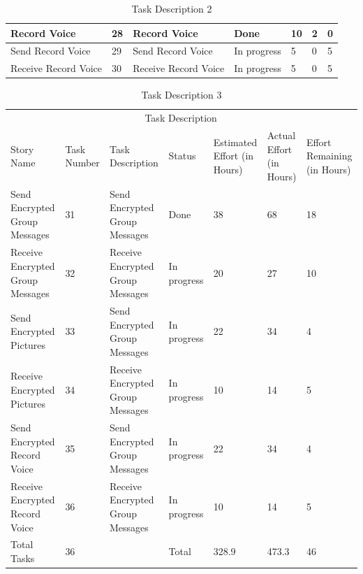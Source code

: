 \documentclass[a4paper]{article}
\begin{document}
\begin{table}[H]
\begin{tabular}{p{3cm} p{1cm} p{3.5cm} p{1cm} p{1cm} p{1cm} p{1cm}}
 Record Voice & 28 & Record Voice & Done & 10 & 2 & 0\\ 
 \midrule
 
 Send Record Voice & 29 & Send Record Voice & In progress & 5 & 0 & 5\\ 
 \midrule
 
 Receive Record Voice & 30 & Receive Record Voice & In progress & 5 & 0 & 5\\ 
\hline
\end{tabular}
\caption{Task Description 2} %
\label{tab:template} %
\end{table}

\vfill
\clearpage


\begin{table}[H]
\begin{tabular}{p{3cm} p{1cm} p{3.5cm} p{1cm} p{1cm} p{1cm} p{1cm}} 
\hline %
& \multicolumn{5}{c}{Task Description} \\
\cmidrule(l){2-7}
Story Name & Task Number & Task Description & Status & Estimated Effort (in Hours) & Actual Effort (in Hours) & Effort Remaining (in Hours)\\ %
\hline

  Send Encrypted Group Messages & 31 & Send Encrypted Group Messages & Done & 38 & 68 & 18\\ 
 \midrule
 
 Receive Encrypted Group Messages & 32 & Receive Encrypted Group Messages & In progress & 20 & 27 & 10\\ 
 \midrule

 
  Send Encrypted Pictures & 33 & Send Encrypted Group Messages & In progress & 22 & 34 & 4\\ 
 \midrule
 
 Receive Encrypted Pictures & 34 & Receive Encrypted Group Messages & In progress & 10 & 14 & 5\\ 
 \midrule
 
  
  Send Encrypted Record Voice & 35 & Send Encrypted Group Messages & In progress & 22 & 34 & 4\\ 
 \midrule
 
 Receive Encrypted Record Voice & 36 & Receive Encrypted Group Messages & In progress & 10 & 14 & 5\\ 
\hline
Total Tasks & 36 & & Total & 328.9 & 473.3 & 46\\
\hline
\end{tabular}
\caption{Task Description 3} %
\label{tab:template} %
\end{table}
\end{document}
